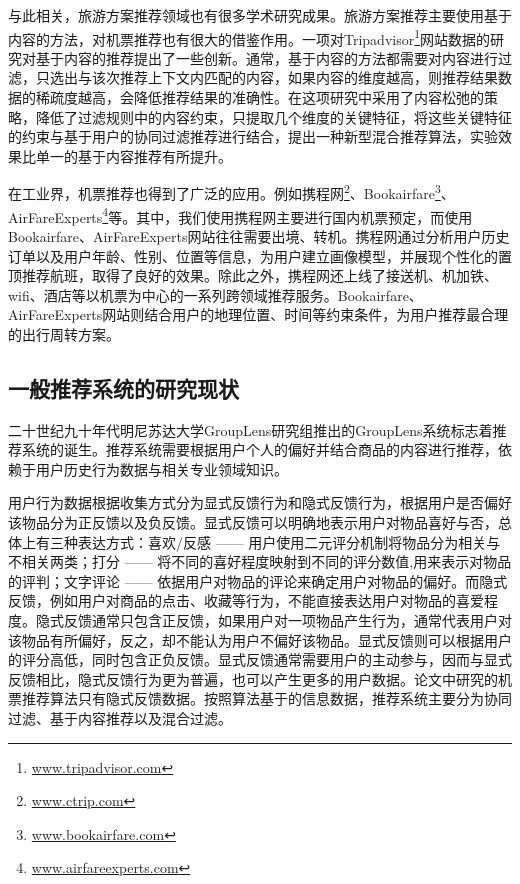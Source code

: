 与此相关，旅游方案推荐领域也有很多学术研究成果。旅游方案推荐主要使用基于内容的方法，对机票推荐也有很大的借鉴作用。一项对Tripadvisor\footnote{\url{www.tripadvisor.com}}网站数据的研究对基于内容的推荐提出了一些创新。通常，基于内容的方法都需要对内容进行过滤，只选出与该次推荐上下文内匹配的内容，如果内容的维度越高，则推荐结果数据的稀疏度越高，会降低推荐结果的准确性。在这项研究中采用了内容松弛的策略，降低了过滤规则中的内容约束，只提取几个维度的关键特征，将这些关键特征的约束与基于用户的协同过滤推荐进行结合，提出一种新型混合推荐算法，实验效果比单一的基于内容推荐有所提升。

在工业界，机票推荐也得到了广泛的应用。例如携程网\footnote{\url{www.ctrip.com}}、Bookairfare\footnote{\url{www.bookairfare.com}}、AirFareExperts\footnote{\url{www.airfareexperts.com}}等。其中，我们使用携程网主要进行国内机票预定，而使用Bookairfare、AirFareExperts网站往往需要出境、转机。携程网通过分析用户历史订单以及用户年龄、性别、位置等信息，为用户建立画像模型，并展现个性化的置顶推荐航班，取得了良好的效果。除此之外，携程网还上线了接送机、机加铁、wifi、酒店等以机票为中心的一系列跨领域推荐服务。Bookairfare、AirFareExperts网站则结合用户的地理位置、时间等约束条件，为用户推荐最合理的出行周转方案。

\subsection{一般推荐系统的研究现状}

二十世纪九十年代明尼苏达大学GroupLens研究组推出的GroupLens系统\cite{konstan1997grouplens}标志着推荐系统的诞生。推荐系统需要根据用户个人的偏好并结合商品的内容进行推荐，依赖于用户历史行为数据与相关专业领域知识。

用户行为数据根据收集方式分为显式反馈行为和隐式反馈行为\cite{nunez2012implicit,lin2001characterized}，根据用户是否偏好该物品分为正反馈以及负反馈\cite{bobadilla2013recommender}。显式反馈可以明确地表示用户对物品喜好与否，总体上有三种表达方式：喜欢/反感 —— 用户使用二元评分机制将物品分为相关与不相关两类；打分 —— 将不同的喜好程度映射到不同的评分数值,用来表示对物品的评判；文字评论 —— 依据用户对物品的评论来确定用户对物品的偏好。而隐式反馈，例如用户对商品的点击、收藏等行为，不能直接表达用户对物品的喜爱程度。隐式反馈通常只包含正反馈，如果用户对一项物品产生行为，通常代表用户对该物品有所偏好，反之，却不能认为用户不偏好该物品。显式反馈则可以根据用户的评分高低，同时包含正负反馈。显式反馈通常需要用户的主动参与，因而与显式反馈相比，隐式反馈行为更为普遍，也可以产生更多的用户数据。论文中研究的机票推荐算法只有隐式反馈数据。按照算法基于的信息数据，推荐系统主要分为协同过滤\cite{ekstrand2011collaborative}、基于内容推荐\cite{pazzani2007content,bogers2015report}以及混合过滤\cite{bellogin2013empirical}。

